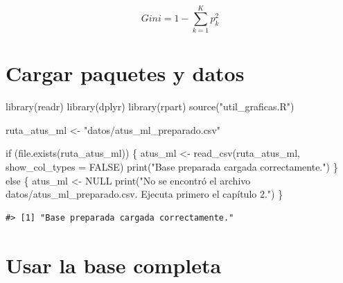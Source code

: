 \documentclass[
  spanish,
  10.5pt,
  letterpaper,
  openany,
  headings=big]{scrbook}
\newenvironment{Shaded}{}{}
\newcommand{\AttributeTok}[1]{\textcolor[rgb]{0.84,0.23,0.29}{#1}}
\newcommand{\ConstantTok}[1]{\textcolor[rgb]{0.00,0.36,0.77}{#1}}
\newcommand{\ControlFlowTok}[1]{\textcolor[rgb]{0.84,0.23,0.29}{#1}}
\newcommand{\FunctionTok}[1]{\textcolor[rgb]{0.44,0.26,0.76}{#1}}
\newcommand{\NormalTok}[1]{\textcolor[rgb]{0.14,0.16,0.18}{#1}}
\newcommand{\OtherTok}[1]{\textcolor[rgb]{0.44,0.26,0.76}{#1}}
\newcommand{\StringTok}[1]{\textcolor[rgb]{0.01,0.18,0.38}{#1}}
\begin{document}
\[
Gini = 1 - \sum_{k=1}^{K} p_k^2
\]

\section{Cargar paquetes y datos}\label{cargar-paquetes-y-datos-1}

\begin{Shaded}
\begin{Highlighting}[]
\FunctionTok{library}\NormalTok{(readr)}
\FunctionTok{library}\NormalTok{(dplyr)}
\FunctionTok{library}\NormalTok{(rpart)}
\FunctionTok{source}\NormalTok{(}\StringTok{"util\_graficas.R"}\NormalTok{)}

\NormalTok{ruta\_atus\_ml }\OtherTok{\textless{}{-}} \StringTok{"datos/atus\_ml\_preparado.csv"}

\ControlFlowTok{if}\NormalTok{ (}\FunctionTok{file.exists}\NormalTok{(ruta\_atus\_ml)) \{}
\NormalTok{  atus\_ml }\OtherTok{\textless{}{-}} \FunctionTok{read\_csv}\NormalTok{(ruta\_atus\_ml, }\AttributeTok{show\_col\_types =} \ConstantTok{FALSE}\NormalTok{)}
  \FunctionTok{print}\NormalTok{(}\StringTok{"Base preparada cargada correctamente."}\NormalTok{)}
\NormalTok{\} }\ControlFlowTok{else}\NormalTok{ \{}
\NormalTok{  atus\_ml }\OtherTok{\textless{}{-}} \ConstantTok{NULL}
  \FunctionTok{print}\NormalTok{(}\StringTok{"No se encontró el archivo datos/atus\_ml\_preparado.csv. Ejecuta primero el capítulo 2."}\NormalTok{)}
\NormalTok{\}}
\end{Highlighting}
\end{Shaded}

\begin{verbatim}
#> [1] "Base preparada cargada correctamente."
\end{verbatim}

\section{Usar la base completa}\label{usar-la-base-completa}
\end{document}
